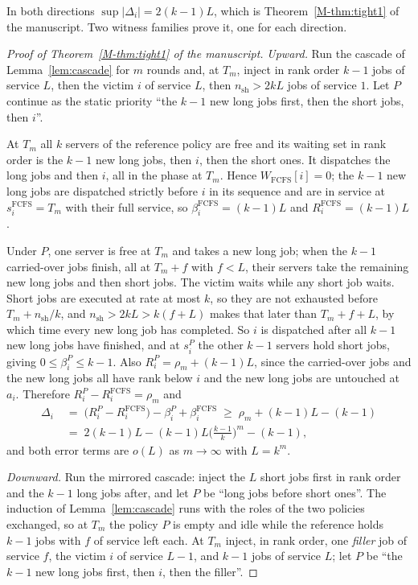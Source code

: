 \documentclass[mathematics,supfile,submit,moreauthors]{Definitions/mdpi}
\begin{document}
In both directions $\sup|\Delta_i| = 2(k-1)L$, which is Theorem~\ref*{M-thm:tight1} of the manuscript. Two
witness families prove it, one for each direction.

\begin{proof}[Proof of Theorem~\ref*{M-thm:tight1} of the manuscript]
\emph{Upward.} Run the cascade of Lemma~\ref{lem:cascade} for $m$ rounds and, at
$T_m$, inject in rank order $k-1$ jobs of service $L$, then the victim $i$ of
service $L$, then $n_{\mathrm{sh}} > 2kL$ jobs of service $1$. Let $P$ continue as the static
priority ``the $k-1$ new long jobs first, then the short jobs, then $i$''.

At $T_m$ all $k$ servers of the reference policy are free and its waiting set in
rank order is the $k-1$ new long jobs, then $i$, then the short ones. It
dispatches the long jobs and then $i$, all in the phase at $T_m$. Hence
$W_{\mathrm{FCFS}}[i] = 0$; the $k-1$ new long jobs are dispatched strictly
before $i$ in its sequence and are in service at $s^{\mathrm{FCFS}}_i = T_m$
with their full service, so $\beta^{\mathrm{FCFS}}_i = (k-1)L$ and
$R^{\mathrm{FCFS}}_i = (k-1)L$.

Under $P$, one server is free at $T_m$ and takes a new long job; when the $k-1$
carried-over jobs finish, all at $T_m + f$ with $f < L$, their servers take the
remaining new long jobs and then short jobs. The victim waits while any short
job waits. Short jobs are executed at rate at most $k$, so they are not exhausted
before $T_m + n_{\mathrm{sh}}/k$, and $n_{\mathrm{sh}} > 2kL > k(f+L)$ makes
that later than $T_m + f + L$,
by which time every new long job has completed. So $i$ is dispatched after all
$k-1$ new long jobs have finished, and at $s^P_i$ the other $k-1$ servers hold
short jobs, giving $0 \le \beta^P_i \le k-1$. Also
$R^P_i = \rho_m + (k-1)L$, since the carried-over jobs and the new long jobs all
have rank below $i$ and the new long jobs are untouched at $a_i$. Therefore
$R^P_i - R^{\mathrm{FCFS}}_i = \rho_m$ and
\begin{align*}
  \Delta_i \;&=\; \bigl(R^P_i - R^{\mathrm{FCFS}}_i\bigr) - \beta^P_i
                 + \beta^{\mathrm{FCFS}}_i
  \;\ge\; \rho_m + (k-1)L - (k-1) \\
  \;&=\; 2(k-1)L - (k-1)L\bigl(\tfrac{k-1}{k}\bigr)^{m} - (k-1) ,
\end{align*}
and both error terms are $o(L)$ as $m \to \infty$ with $L = k^m$.

\emph{Downward.} Run the mirrored cascade: inject the $L$ short jobs first in
rank order and the $k-1$ long jobs after, and let $P$ be ``long jobs before short
ones''. The induction of Lemma~\ref{lem:cascade} runs with the roles of the two
policies exchanged, so at $T_m$ the policy $P$ is empty and idle while the
reference holds $k-1$ jobs with $f$ of service left each. At $T_m$ inject, in
rank order, one \emph{filler} job of service $f$, the victim $i$ of service
$L-1$, and $k-1$ jobs of service $L$; let $P$ be ``the $k-1$ new long jobs
first, then $i$, then the filler''.


\end{proof}
\end{document}
